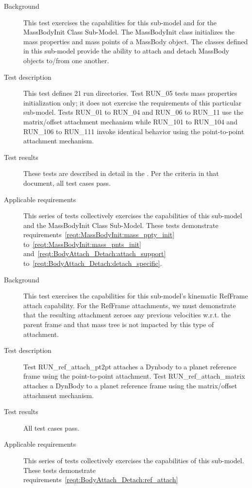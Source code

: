 \label{test:BodyAttach_Detach:attach_detach}
\begin{description}
\item[Background]
This test exercises the capabilities for this sub-model and
for the  MassBodyInit Class Sub-Model.
The MassBodyInit class initializes the mass properties and mass points
of a MassBody object. The classes defined in this sub-model
provide the ability to attach and detach MassBody objects to/from one another.
\item[Test description]
This test defines 21 run directories.
Test RUN\_05 tests mass properties initialization only;
it does not exercise the requirements of this particular sub-model.
Tests RUN\_01 to RUN\_04 and RUN\_06 to RUN\_11 use the matrix/offset
attachment mechanism while RUN\_101 to RUN\_104 and RUN\_106 to RUN\_111 invoke
identical behavior using the point-to-point attachment mechanism.

\item[Test results]
These tests are described in detail in the
.
Per the criteria in that document,
all test cases pass.

\item[Applicable requirements]
This series of tests collectively exercises the capabilities of this sub-model
and the MassBodyInit Class Sub-Model. These tests demonstrate
requirements~\ref{reqt:MassBodyInit:mass_ppty_init}
to~\ref{reqt:MassBodyInit:mass_pnts_init}
and~\ref{reqt:BodyAttach_Detach:attach_support}
to~\ref{reqt:BodyAttach_Detach:detach_specific}.
\end{description}

\label{test:BodyAttach_Detach:ref_attach}
\begin{description}
\item[Background]
This test exercises the capabilities for this sub-model's kinematic RefFrame attach capability. For the RefFrame
attachments, we must demonstrate that the resulting attachment zeroes any previous velocities w.r.t. the parent frame
and that mass tree is not impacted by this type of attachment.
\item[Test description]
Test RUN\_ref\_attach\_pt2pt attaches a Dynbody to a planet reference frame using the point-to-point attachment.
Test RUN\_ref\_attach\_matrix attaches a DynBody to a planet reference frame using the matrix/offset
attachment mechanism.

\item[Test results]
All test cases pass.

\item[Applicable requirements]
This series of tests collectively exercises the capabilities of this sub-model. These tests demonstrate
requirements~\ref{reqt:BodyAttach_Detach:ref_attach}
\end{description}


